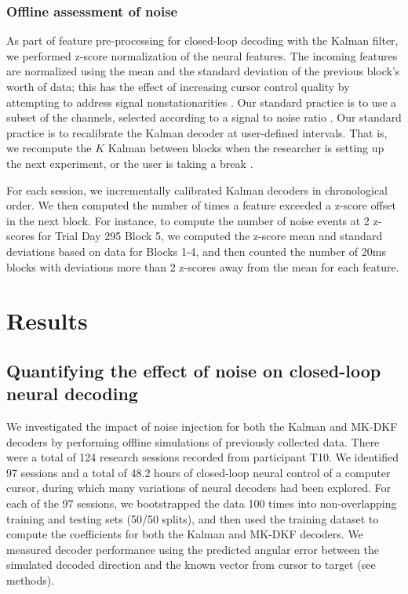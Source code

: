 \subsubsection{Offline assessment of noise}

As part of feature pre-processing for closed-loop decoding with the Kalman filter, we performed z-score normalization of the neural features. The incoming features are normalized using the mean and the standard deviation of the previous block's worth of data; this has the effect of increasing cursor control quality by attempting to address signal nonstationarities \cite{Jarosiewicz2015}. Our standard practice is to use a subset of the channels, selected according to a signal to noise ratio \cite{Malik2015}. Our standard practice is to recalibrate the Kalman decoder at user-defined intervals. That is, we recompute the $K$ Kalman between blocks when the researcher is setting up the next experiment, or the user is taking a break \cite{Jarosiewicz2015}.

For each session, we incrementally calibrated Kalman decoders in chronological order. We then computed the number of times a feature exceeded a z-score offset in the next block. For instance, to compute the number of noise events at 2 z-scores for Trial Day 295 Block 5, we computed the z-score mean and standard deviations based on data for Blocks 1-4, and then counted the number of 20ms blocks with deviations more than 2 z-scores away from the mean for each feature.

\section{Results}

\subsection{Quantifying the effect of noise on closed-loop neural decoding}

We investigated the impact of noise injection for both the Kalman and MK-DKF decoders by performing offline simulations of previously collected data. There were a total of 124 research sessions recorded from participant T10. We identified 97 sessions and a total of 48.2 hours of closed-loop neural control of a computer cursor, during which many variations of neural decoders had been explored. For each of the 97 sessions, we bootstrapped the data 100 times into non-overlapping training and testing sets (50/50 splits), and then used the training dataset to compute the coefficients for both the Kalman and MK-DKF decoders. We measured decoder performance using the predicted angular error between the simulated decoded direction and the known vector from cursor to target (see methods). 

